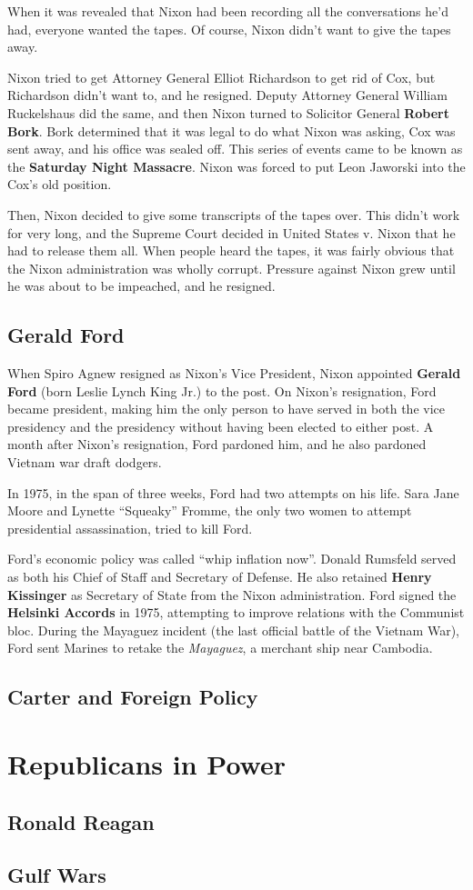 When it was revealed that Nixon had been recording all the conversations he'd had,
everyone wanted the tapes.
Of course, Nixon didn't want to give the tapes away.

Nixon tried to get Attorney General Elliot Richardson to get rid of Cox,
but Richardson didn't want to, and he resigned.
Deputy Attorney General William Ruckelshaus did the same,
and then Nixon turned to Solicitor General \textbf{Robert Bork}.
Bork determined that it was legal to do what Nixon was asking, Cox was sent away, and his office was sealed off.
This series of events came to be known as the \textbf{Saturday Night Massacre}.
Nixon was forced to put Leon Jaworski into the Cox's old position.

Then, Nixon decided to give some transcripts of the tapes over.
This didn't work for very long,
and the Supreme Court decided in United States v. Nixon that he had to release them all.
When people heard the tapes, it was fairly obvious that the Nixon administration was wholly corrupt.
Pressure against Nixon grew until he was about to be impeached, and he resigned.

\subsection*{Gerald Ford}

When Spiro Agnew resigned as Nixon's Vice President,
Nixon appointed \textbf{Gerald Ford} (born Leslie Lynch King Jr.) to the post.
On Nixon's resignation, Ford became president,
making him the only person to have served in both the vice presidency and the presidency
without having been elected to either post.
A month after Nixon's resignation, Ford pardoned him, and he also pardoned Vietnam war draft dodgers.

In 1975, in the span of three weeks, Ford had two attempts on his life.
Sara Jane Moore and Lynette ``Squeaky'' Fromme,
the only two women to attempt presidential assassination, tried to kill Ford.

Ford's economic policy was called ``whip inflation now''.
Donald Rumsfeld served as both his Chief of Staff and Secretary of Defense.
He also retained \textbf{Henry Kissinger} as Secretary of State from the Nixon administration.
Ford signed the \textbf{Helsinki Accords} in 1975, attempting to improve relations with the Communist bloc.
During the Mayaguez incident (the last official battle of the Vietnam War),
Ford sent Marines to retake the \textit{Mayaguez}, a merchant ship near Cambodia.

\subsection*{Carter and Foreign Policy}

\section{Republicans in Power}

\subsection*{Ronald Reagan}

\subsection*{Gulf Wars}
